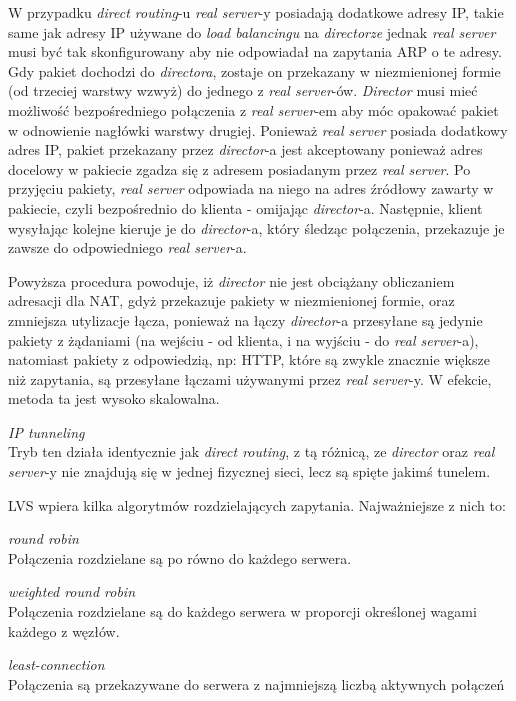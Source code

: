 {\begin{description}
		W przypadku \textit{direct routing}-u \textit{real server}-y posiadają dodatkowe adresy IP, takie same jak adresy IP używane do \textit{load balancingu} na \textit{directorze} jednak \textit{real server} musi być tak skonfigurowany aby nie odpowiadał na zapytania ARP o te adresy.\\
		Gdy pakiet dochodzi do \textit{directora}, zostaje on przekazany w niezmienionej formie (od trzeciej warstwy wzwyż) do jednego z \textit{real server}-ów. \textit{Director} musi mieć możliwość bezpośredniego połączenia z \textit{real server}-em aby móc opakować pakiet w odnowienie nagłówki warstwy drugiej.
		Ponieważ \textit{real server} posiada dodatkowy adres IP, pakiet przekazany przez \textit{director}-a jest akceptowany ponieważ adres docelowy w pakiecie zgadza się z adresem posiadanym przez \textit{real server}.
		Po przyjęciu pakiety, \textit{real server} odpowiada na niego na adres źródłowy zawarty w pakiecie, czyli bezpośrednio do klienta - omijając \textit{director}-a.
		Następnie, klient wysyłając kolejne kieruje je do \textit{director}-a, który śledząc połączenia, przekazuje je zawsze do odpowiedniego \textit{real server}-a.

		Powyższa procedura powoduje, iż \textit{director} nie jest obciążany obliczaniem adresacji dla NAT, gdyż przekazuje pakiety w niezmienionej formie, oraz zmniejsza utylizacje łącza, ponieważ na łączy \textit{director}-a przesyłane są jedynie pakiety z żądaniami (na wejściu - od klienta, i na wyjściu - do \textit{real server}-a), natomiast pakiety z odpowiedzią, np: HTTP, które są zwykle znacznie większe niż zapytania, są przesyłane łączami używanymi przez \textit{real server}-y.
		W efekcie, metoda ta jest wysoko skalowalna.
	\item{\textit{IP tunneling}}\\
		Tryb ten działa identycznie jak \textit{direct routing}, z tą różnicą, ze \textit{director} oraz \textit{real server}-y nie znajdują się w jednej fizycznej sieci, lecz są spięte jakimś tunelem.
\end{description}
LVS wpiera kilka algorytmów rozdzielających zapytania. Najważniejsze z nich to:
\begin{description}
	\item{\textit{round robin}}\\
		Połączenia rozdzielane są po równo do każdego serwera.
	\item{\textit{weighted round robin}}\\
		Połączenia rozdzielane są do każdego serwera w proporcji określonej wagami każdego z węzłów.
	\item{\textit{least-connection}}\\
		Połączenia są przekazywane do serwera z najmniejszą liczbą aktywnych połączeń
\end{description}

}
